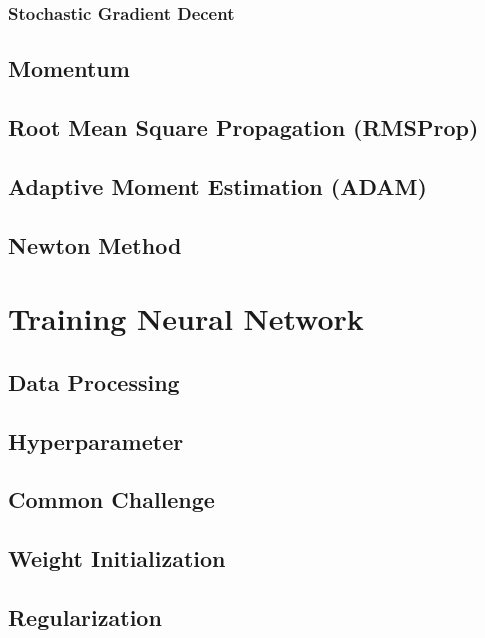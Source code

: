 \documentclass[10pt]{article}
\begin{document}
\subsubsection{Stochastic Gradient Decent}

\subsection{Momentum}

\subsection{Root Mean Square Propagation (RMSProp)}

\subsection{Adaptive Moment Estimation (ADAM)}

\subsection{Newton Method}

\section{Training Neural Network}

\subsection{Data Processing}

\subsection{Hyperparameter}

\subsection{Common Challenge}


\subsection{Weight Initialization}

\subsection{Regularization}
\end{document}

